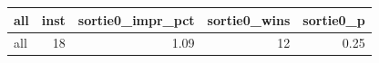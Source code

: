 \begin{tabular}{lrrrr}
\toprule
all & inst & sortie0_impr_pct & sortie0_wins & sortie0_p \\
\midrule
all & 18 & 1.09 & 12 & 0.25 \\
\bottomrule
\end{tabular}
